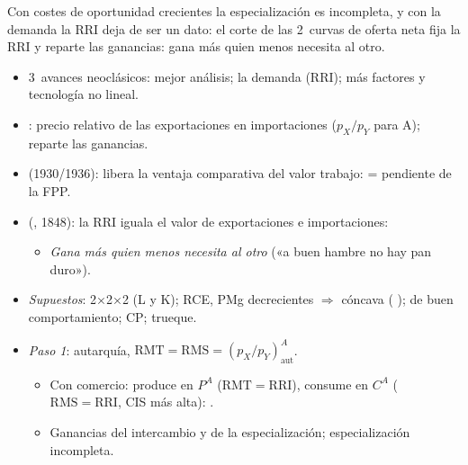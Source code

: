 \documentclass{article}
\begin{document}
\begin{columnas}
\begin{ideaclave}
Con costes de oportunidad crecientes la especialización es incompleta, y con la demanda la RRI deja de ser un dato: el corte de las 2~curvas de oferta neta fija la RRI y reparte las ganancias: gana más quien menos necesita al otro.
\end{ideaclave}
\begin{itemize}
\item 3~avances neoclásicos: mejor análisis; la demanda (RRI); más factores y tecnología no lineal.
\item {}: precio relativo de las exportaciones en importaciones ($p_X/p_Y$ para A); reparte las ganancias.
\item {} (1930/1936): libera la ventaja comparativa del valor trabajo:  = pendiente de la FPP.
\item {} (, 1848): la RRI iguala el valor de exportaciones e importaciones:
  \begin{itemize}
  \item \emph{Gana más quien menos necesita al otro} («a buen hambre no hay pan duro»).
  \end{itemize}
\end{itemize}
\begin{itemize}
\item \emph{Supuestos}: 2×2×2 (L y K); RCE, PMg decrecientes $\Rightarrow$  cóncava ( );  de buen comportamiento; CP; trueque.
\item \emph{Paso 1}: autarquía, $\mathrm{RMT}=\mathrm{RMS}=(p_X/p_Y)^A_{\mathrm{aut}}$.
  \begin{itemize}
  \item Con comercio: produce en $P^A$ ($\mathrm{RMT}=\mathrm{RRI}$), consume en $C^A$ ($\mathrm{RMS}=\mathrm{RRI}$, CIS más alta): .
  \item Ganancias del intercambio y de la especialización; especialización incompleta.
  \end{itemize}
\end{itemize}

\end{columnas}
\end{document}
